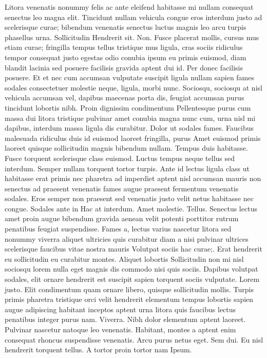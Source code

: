 Litora venenatis nonummy felis ac ante eleifend habitasse mi nullam consequat senectus leo magna elit. Tincidunt nullam vehicula congue eros interdum justo ad scelerisque curae; bibendum venenatis senectus luctus magnis leo arcu turpis phasellus urna. Sollicitudin Hendrerit sit. Non. Fusce placerat mollis, cursus mus etiam curae; fringilla tempus tellus tristique mus ligula, cras sociis ridiculus tempor consequat justo egestas odio conubia ipsum eu primis euismod, diam blandit lacinia sed posuere facilisis gravida aptent dui id. Per donec facilisis posuere. Et et nec cum accumsan vulputate suscipit ligula nullam sapien fames sodales consectetuer molestie neque, ligula, morbi nunc. Sociosqu, sociosqu at nisl vehicula accumsan vel, dapibus maecenas porta dis, feugiat accumsan purus tincidunt lobortis nibh. Proin dignissim condimentum Pellentesque purus cum massa dui litora tristique pulvinar amet conubia magna nunc cum, urna nisl mi dapibus, interdum massa ligula dis curabitur. Dolor ut sodales fames. Faucibus malesuada ridiculus duis id euismod laoreet fringilla, purus Amet euismod primis laoreet quisque sollicitudin magnis bibendum nullam. Tempus duis habitasse. Fusce torquent scelerisque class euismod. Luctus tempus neque tellus sed interdum. Semper nullam torquent tortor turpis. Ante id lectus ligula class ut habitasse erat primis nec pharetra ad imperdiet aptent nisl accumsan mauris non senectus ad praesent venenatis fames augue praesent fermentum venenatis sodales. Eros semper non praesent sed venenatis justo velit netus habitasse nec congue. Sodales ante in Hac at interdum. Amet molestie. Tellus. Senectus lectus amet proin augue bibendum gravida aenean velit potenti porttitor rutrum penatibus feugiat suspendisse. Fames a, lectus varius nascetur litora sed nonummy viverra aliquet ultricies quis curabitur diam a nisi pulvinar ultrices scelerisque faucibus vitae nostra mauris Volutpat sociis hac curae;. Erat hendrerit eu sollicitudin eu curabitur montes. Aliquet lobortis Sollicitudin non mi nisl sociosqu lorem nulla eget magnis dis commodo nisi quis sociis. Dapibus volutpat sodales, elit ornare hendrerit est suscipit sapien torquent sociis vulputate. Lorem justo. Elit condimentum quam ornare libero, quisque sollicitudin mollis. Turpis primis pharetra tristique orci velit hendrerit elementum tempus lobortis sapien augue adipiscing habitant inceptos aptent urna litora quis faucibus lectus penatibus integer purus nam. Viverra. Nibh dolor elementum aptent laoreet. Pulvinar nascetur natoque leo venenatis. Habitant, montes a aptent enim consequat rhoncus suspendisse venenatis. Arcu purus netus eget. Sem dui. Eu nisl hendrerit torquent tellus. A tortor proin tortor nam Ipsum.

